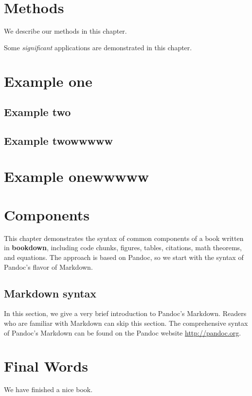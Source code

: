\documentclass[]{krantz}
\begin{document}
\hypertarget{methods}{%
\chapter{Methods}\label{methods}}

We describe our methods in this chapter.

\hypertarget{appendix-apendice}{%
\appendix {}}


Some \emph{significant} applications are demonstrated in this chapter.

\hypertarget{example-one}{%
\chapter{Example one}\label{example-one}}

\hypertarget{example-two}{%
\section{Example two}\label{example-two}}

\hypertarget{example-twowwwww}{%
\section{Example twowwwww}\label{example-twowwwww}}

\hypertarget{example-onewwwww}{%
\chapter{Example onewwwww}\label{example-onewwwww}}

\hypertarget{components}{%
\chapter{Components}\label{components}}

This chapter demonstrates the syntax of common components of a book written in \textbf{bookdown}, including code chunks, figures, tables, citations, math theorems, and equations. The approach is based on Pandoc, so we start with the syntax of Pandoc's flavor of Markdown.

\hypertarget{markdown-syntax}{%
\section{Markdown syntax}\label{markdown-syntax}}

In this section, we give a very brief introduction to Pandoc's Markdown. Readers who are familiar with Markdown can skip this section. The comprehensive syntax of Pandoc's Markdown can be found on the Pandoc website \url{http://pandoc.org}.

\hypertarget{final-words}{%
\chapter{Final Words}\label{final-words}}

We have finished a nice book.



\printindex
\end{document}
